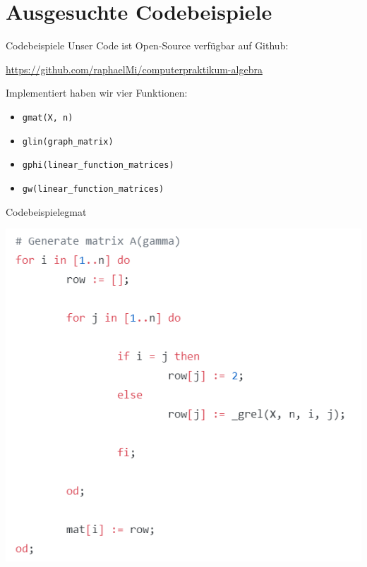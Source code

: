 \documentclass[9pt]{beamer}
\begin{document}
\section{Ausgesuchte Codebeispiele}
\begin{frame}{Codebeispiele}
Unser Code ist Open-Source verfügbar auf Github: \begin{center}\url{https://github.com/raphaelMi/computerpraktikum-algebra}\end{center}

Implementiert haben wir vier Funktionen:
\begin{itemize}
\item{\texttt{gmat(X, n)}}
\item{\texttt{glin(graph\_matrix)}}
\item{\texttt{gphi(linear\_function\_matrices)}}
\item{\texttt{gw(linear\_function\_matrices)}}
\end{itemize}
\end{frame}

\begin{frame}{Codebeispiele}{gmat}
\begin{center}
\includegraphics[scale=0.75]{assets/gmat_code.png}
\end{center}
\end{frame}
\end{document}
